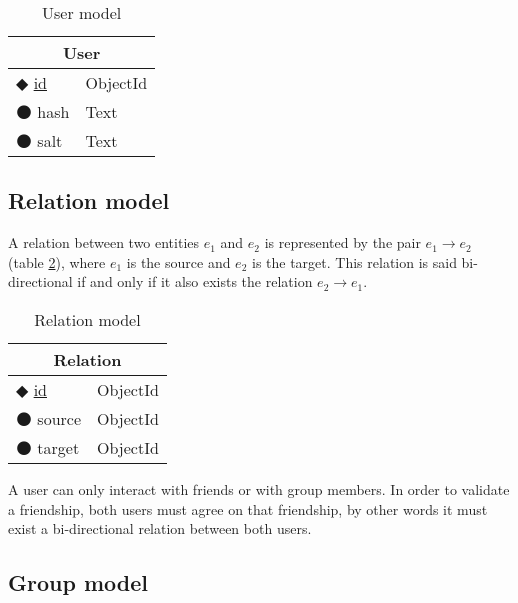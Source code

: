 \begin{table}[!htb]
\centering
\caption{User model}
\label{table:user}
    \begin{tabular}{|ll|}
        \hline
        \multicolumn{2}{|c|}{\textbf{User}}                             \\ \hline
        $\Diamondblack$ \underline{id}  & ObjectId                      \\ 
        $\medbullet$ hash           & Text                         \\ 
        $\medbullet$ salt      & Text                         \\ \hline
    \end{tabular}
\end{table}

\subsection{Relation model}

A relation between two entities $e_1$ and $e_2$ is represented by the pair $e_1\rightarrow e_2$ (table \ref{table:relation}), where $e_1$ is the source and $e_2$ is the target. This relation is said bi-directional if and only if it also exists the relation $e_2\rightarrow e_1$.

\begin{table}[!htb]
\centering
\caption{Relation model}
\label{table:relation}
    \begin{tabular}{|ll|}
        \hline
        \multicolumn{2}{|c|}{\textbf{Relation}}                             \\ \hline
        $\Diamondblack$ \underline{id}  & ObjectId                      \\ 
        $\medbullet$ source           & ObjectId                         \\ 
        $\medbullet$ target      & ObjectId                         \\ \hline
    \end{tabular}
\end{table}

A user can only interact with friends or with group members. In order to validate a friendship, both users must agree on that friendship, by other words it must exist a bi-directional relation between both users.

\subsection{Group model}

